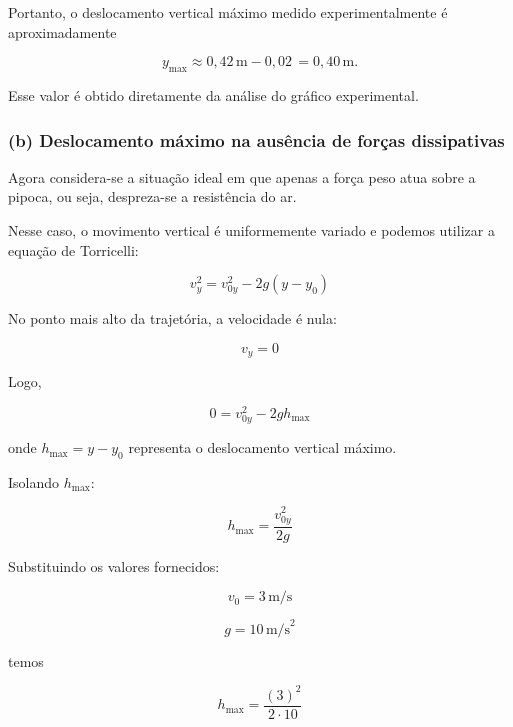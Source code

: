 \documentclass[a4paper,12pt]{article}
\begin{document}
Portanto, o deslocamento vertical máximo medido experimentalmente é aproximadamente

\begin{equation}
y_{\max} \approx 0{,}42\,\text{m} - 0{,}02\, = 0{,}40\,\text{m} .
\end{equation}

Esse valor é obtido diretamente da análise do gráfico experimental.

\subsubsection*{(b) Deslocamento máximo na ausência de forças dissipativas}

Agora considera-se a situação ideal em que apenas a força peso atua sobre a pipoca, ou seja, despreza-se a resistência do ar.

Nesse caso, o movimento vertical é uniformemente variado e podemos utilizar a equação de Torricelli:

\begin{equation}
v_{y}^2 = v_{0y}^2 - 2g(y - y_0)
\end{equation}

No ponto mais alto da trajetória, a velocidade é nula:

\begin{equation}
v_{y}=0
\end{equation}

Logo,

\begin{equation}
0 = v_{0y}^2 - 2g h_{\max}
\end{equation}

onde \(h_{\max} = y - y_0\) representa o deslocamento vertical máximo.

Isolando \(h_{\max}\):

\begin{equation}
h_{\max} = \frac{v_{0y}^2}{2g}
\end{equation}

Substituindo os valores fornecidos:

\begin{equation}
v_0 = 3\,\text{m/s}
\end{equation}

\begin{equation}
g = 10\,\text{m/s}^2
\end{equation}

temos

\begin{equation}
h_{\max} = \frac{(3)^2}{2 \cdot 10}
\end{equation}
\end{document}
